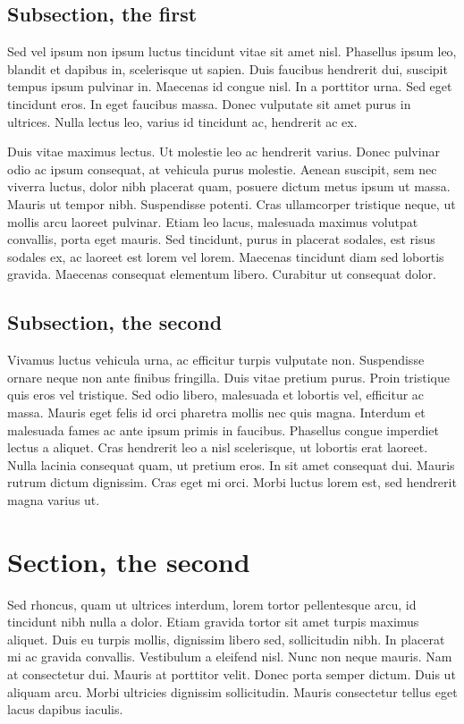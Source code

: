 \subsection{Subsection, the first}

Sed vel ipsum non ipsum luctus tincidunt vitae sit amet nisl. Phasellus ipsum leo, blandit et dapibus in, scelerisque ut
sapien. Duis faucibus hendrerit dui, suscipit tempus ipsum pulvinar in. Maecenas id congue nisl. In a porttitor urna.
Sed eget tincidunt eros. In eget faucibus massa. Donec vulputate sit amet purus in ultrices. Nulla lectus leo, varius id
tincidunt ac, hendrerit ac ex.

Duis vitae maximus lectus. Ut molestie leo ac hendrerit varius. Donec pulvinar odio ac ipsum consequat, at vehicula
purus molestie. Aenean suscipit, sem nec viverra luctus, dolor nibh placerat quam, posuere dictum metus ipsum ut massa.
Mauris ut tempor nibh. Suspendisse potenti. Cras ullamcorper tristique neque, ut mollis arcu laoreet pulvinar. Etiam leo
lacus, malesuada maximus volutpat convallis, porta eget mauris. Sed tincidunt, purus in placerat sodales, est risus
sodales ex, ac laoreet est lorem vel lorem. Maecenas tincidunt diam sed lobortis gravida. Maecenas consequat elementum
libero. Curabitur ut consequat dolor.

\subsection{Subsection, the second}

Vivamus luctus vehicula urna, ac efficitur turpis vulputate non. Suspendisse ornare neque non ante finibus fringilla.
Duis vitae pretium purus. Proin tristique quis eros vel tristique. Sed odio libero, malesuada et lobortis vel, efficitur
ac massa. Mauris eget felis id orci pharetra mollis nec quis magna. Interdum et malesuada fames ac ante ipsum primis in
faucibus. Phasellus congue imperdiet lectus a aliquet. Cras hendrerit leo a nisl scelerisque, ut lobortis erat laoreet.
Nulla lacinia consequat quam, ut pretium eros. In sit amet consequat dui. Mauris rutrum dictum dignissim. Cras eget mi
orci. Morbi luctus lorem est, sed hendrerit magna varius ut.

\section{Section, the second}

Sed rhoncus, quam ut ultrices interdum, lorem tortor pellentesque arcu, id tincidunt nibh nulla a dolor. Etiam gravida
tortor sit amet turpis maximus aliquet. Duis eu turpis mollis, dignissim libero sed, sollicitudin nibh. In placerat mi
ac gravida convallis. Vestibulum a eleifend nisl. Nunc non neque mauris. Nam at consectetur dui. Mauris at porttitor
velit. Donec porta semper dictum. Duis ut aliquam arcu. Morbi ultricies dignissim sollicitudin. Mauris consectetur
tellus eget lacus dapibus iaculis.

